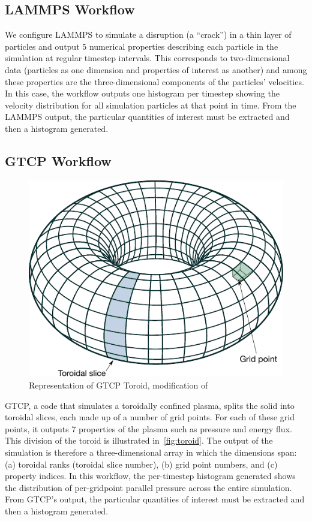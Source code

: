 \documentclass[conference]{IEEEtran}
\begin{document}
\subsection{LAMMPS Workflow}

We configure LAMMPS to simulate a disruption (a ``crack'') in a thin layer of
particles and output 5 numerical properties describing each particle in the
simulation at regular timestep intervals. This corresponds to two-dimensional
data (particles as one dimension and properties of interest as another) and
among these properties are the three-dimensional components of the particles'
velocities. In this case, the workflow outputs one histogram per timestep
showing the velocity distribution for all simulation particles at that point in
time.  From the LAMMPS output, the particular quantities of interest must be
extracted and then a histogram generated.

\subsection{GTCP Workflow}

\begin{figure}
  \centering
  \vspace{-0.10in}
  \includegraphics[width=0.7\columnwidth]{fig/Simple_Torus_mod}
  \vspace{-0.09in}
  \caption{Representation of GTCP Toroid, modification of \cite{WikimediaCommons:torus}}
  \label{fig:toroid}
  \vspace{-0.20in}
\end{figure}

GTCP, a code that simulates a toroidally confined plasma, splits the solid into
toroidal slices, each made up of a number of grid points. For each of these
grid points, it outputs 7 properties of the plasma such as pressure and energy
flux. This division of the toroid is illustrated in~\autoref{fig:toroid}.
The output of the simulation is therefore a three-dimensional array in which
the dimensions span: (a) toroidal ranks (toroidal slice number), (b) grid point
numbers, and (c) property indices. In this workflow, the per-timestep histogram
generated shows the distribution of per-gridpoint parallel pressure across
the entire simulation. From GTCP's output, the particular quantities of
interest must be extracted and then a histogram generated.
\end{document}
